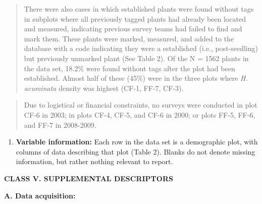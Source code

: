 \documentclass[
  man, donotrepeattitle,floatsintext]{apa6}
\providecommand{\tightlist}{%
  \setlength{\itemsep}{0pt}\setlength{\parskip}{0pt}}
\begin{document}
\begin{quote}
There were also cases in which established plants were found without tags in subplots where all previously tagged plants had already been located and measured, indicating previous survey teams had failed to find and mark them. These plants were marked, measured, and added to the database with a code indicating they were a established (i.e., post-seedling) but previously unmarked plant (See Table 2). Of the N = 1562 plants in the data set, 18.2\% were found without tags after the plot had been established. Almost half of these (45\%) were in the three plots where \emph{H. acuminata} density was highest (CF-1, FF-7, CF-3).
\end{quote}

\begin{quote}
Due to logistical or financial constraints, no surveys were conducted in plot CF-6 in 2003; in plots CF-4, CF-5, and CF-6 in 2000; or plots FF-5, FF-6, and FF-7 in 2008-2009.
\end{quote}

\begin{enumerate}
\def\labelenumi{\arabic{enumi}.}
\setcounter{enumi}{9}
\tightlist
\item
  \textbf{Variable information:} Each row in the data set is a demographic plot, with columns of data describing that plot (Table 2). Blanks do not denote missing information, but rather nothing relevant to report.
\end{enumerate}

\noindent
\textbf{CLASS V. SUPPLEMENTAL DESCRIPTORS}

\noindent  
\textbf{A. Data acquisition:}
\end{document}
